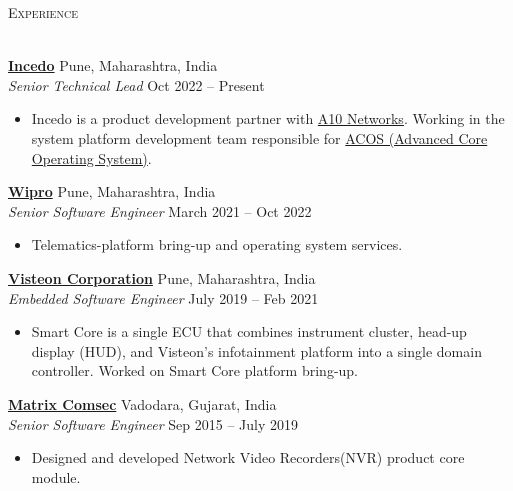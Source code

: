 \documentclass[a4paper]{article}
\newcommand{\lineunder} {
    \vspace*{-8pt} \\
    \hspace*{-18pt} \hrulefill \\
}
\newcommand{\header} [1] {
    {\hspace*{-18pt}\vspace*{6pt} \textsc{#1}}
    \vspace*{-6pt} \lineunder
}
\begin{document}
\header{Experience}
\vspace{1mm}

\textbf{\href{https://www.incedoinc.com}{Incedo}} \hfill Pune, Maharashtra, India\\
\textit{Senior Technical Lead} \hfill Oct 2022 -- Present\\
\vspace{-1mm}
\begin{itemize} \itemsep 1pt
	\item Incedo is a product development partner with \href{https://www.a10networks.com/products/}{A10 Networks}. Working in the system platform development team responsible for \href{https://www.a10networks.com/solutions/advanced-core-operating-system/}{ACOS (Advanced Core Operating System)}.
\end{itemize}

\textbf{\href{https://www.wipro.com/}{Wipro}} \hfill Pune, Maharashtra, India\\
\textit{Senior Software Engineer} \hfill March 2021 -- Oct 2022\\
\vspace{-1mm}
\begin{itemize} \itemsep 1pt
	\item Telematics-platform bring-up and operating system services.
\end{itemize}

\textbf{\href{https://www.visteon.com/}{Visteon Corporation}} \hfill Pune, Maharashtra, India\\
\textit{Embedded Software Engineer} \hfill July 2019 -- Feb 2021\\
\vspace{-1mm}
\begin{itemize} \itemsep 1pt
	\item Smart Core is a single ECU that combines instrument cluster, head-up display (HUD), and Visteon's infotainment platform into a single domain controller. Worked on Smart Core platform bring-up.
\end{itemize}

\textbf{\href{https://www.matrixcomsec.com/}{Matrix Comsec}} \hfill Vadodara, Gujarat, India\\
\textit{Senior Software Engineer} \hfill Sep 2015 -- July 2019\\
\vspace{-1mm}
\begin{itemize} \itemsep 1pt
	\item Designed and developed Network Video Recorders(NVR) product core module.
\end{itemize}
\end{document}
